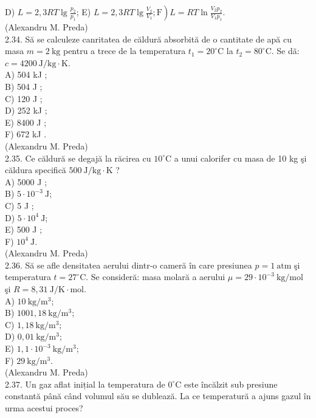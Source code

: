 D) $L=2,3 R T \lg \frac{p_{2}}{p_{1}}$; E) $\left.L=2,3 R T \lg \frac{V_{2}}{V_{1}} ; \mathrm{F}\right) L=R T \ln \frac{V_{2} p_{2}}{V_{1} p_{1}}$.\\
(Alexandru M. Preda)\\
2.34. Să se calculeze canritatea de căldură absorbită de o cantitate de apă cu masa $m=2 \mathrm{~kg}$ pentru a trece de la temperatura $t_{1}=20^{\circ} \mathrm{C}$ la $t_{2}=80^{\circ} \mathrm{C}$. Se dã: $c=4200 \mathrm{~J} / \mathrm{kg} \cdot \mathrm{K}$.\\
A) 504 kJ ;\\
B) 504 J ;\\
C) 120 J ;\\
D) 252 kJ ;\\
E) 8400 J ;\\
F) 672 kJ .\\
(Alexandru M. Preda)\\
2.35. Ce căldură se degajă la răcirea cu $10^{\circ} \mathrm{C}$ a unui calorifer cu masa de 10 kg şi căldura specifică $500 \mathrm{~J} / \mathrm{kg} \cdot \mathrm{K}$ ?\\
A) 5000 J ;\\
B) $5 \cdot 10^{-3} \mathrm{~J}$;\\
C) 5 J ;\\
D) $5 \cdot 10^{4} \mathrm{~J}$;\\
E) 500 J ;\\
F) $10^{4} \mathrm{~J}$.\\
(Alexandru M. Preda)\\
2.36. Să se afle densitatea aerului dintr-o cameră în care presiunea $p=1 \mathrm{~atm}$ şi temperatura $t=27^{\circ} \mathrm{C}$. Se consideră: masa molară a aerului $\mu=29 \cdot 10^{-3} \mathrm{~kg} / \mathrm{mol}$ şi $R=8,31 \mathrm{~J} / \mathrm{K} \cdot \mathrm{mol}$.\\
A) $10 \mathrm{~kg} / \mathrm{m}^{3}$;\\
B) $1001,18 \mathrm{~kg} / \mathrm{m}^{3}$;\\
C) $1,18 \mathrm{~kg} / \mathrm{m}^{3}$;\\
D) $0,01 \mathrm{~kg} / \mathrm{m}^{3}$;\\
E) $1,1 \cdot 10^{-3} \mathrm{~kg} / \mathrm{m}^{3}$;\\
F) $29 \mathrm{~kg} / \mathrm{m}^{3}$.\\
(Alexandru M. Preda)\\
2.37. Un gaz aflat inițial la temperatura de $0^{\circ} \mathrm{C}$ este încălzit sub presiune constantă până când volumul său se dublează. La ce temperatură a ajuns gazul în urma acestui proces?\\

